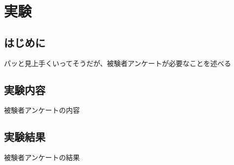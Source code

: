 \documentclass[\homedir/main.tex]{subfiles}
\begin{document}
\setcounter{chapter}{4}
\chapter{実験}\label{chap:results}

\section{はじめに}
パッと見上手くいってそうだが、被験者アンケートが必要なことを述べる

\section{実験内容}
被験者アンケートの内容

\section{実験結果}
被験者アンケートの結果

\printBibForSubfiles
\end{document}
